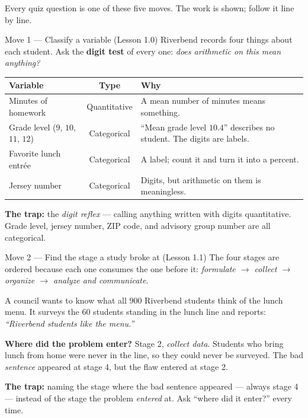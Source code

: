 \documentclass[10pt]{article}
\begin{document}
\small
Every quiz question is one of these five moves. The work is shown; follow it line by line.

\vspace{4pt}
\boxguard[12]
\begin{notesbox}{Move 1 --- Classify a variable (Lesson 1.0)}
\small
Riverbend records four things about each student. Ask the \textbf{digit test} of every one:
\emph{does arithmetic on this mean anything?}

\vspace{2pt}
\renewcommand{\arraystretch}{1.2}
\begin{tabularx}{\linewidth}{@{} X c X @{}}
\rowcolor{frost}
\textbf{Variable} & \textbf{Type} & \textbf{Why} \\
\midrule
Minutes of homework & Quantitative & A mean number of minutes means something. \\
Grade level ($9$, $10$, $11$, $12$) & Categorical & ``Mean grade level $10.4$'' describes no
  student. The digits are labels. \\
Favorite lunch entr\'ee & Categorical & A label; count it and turn it into a percent. \\
Jersey number & Categorical & Digits, but arithmetic on them is meaningless. \\
\end{tabularx}

\vspace{3pt}
\textbf{The trap:} the \emph{digit reflex} --- calling anything written with digits
quantitative. Grade level, jersey number, ZIP code, and advisory group number are all
categorical.
\end{notesbox}

\vspace{3pt}
\boxguard[12]
\begin{notesbox}{Move 2 --- Find the stage a study broke at (Lesson 1.1)}
\small
The four stages are ordered because each one consumes the one before it:
\emph{formulate $\rightarrow$ collect $\rightarrow$ organize $\rightarrow$ analyze and
communicate}.

\vspace{2pt}
A council wants to know what all $900$ Riverbend students think of the lunch menu. It surveys
the $60$ students standing in the lunch line and reports: \emph{``Riverbend students like the
menu.''}

\vspace{2pt}
\textbf{Where did the problem enter?} Stage 2, \emph{collect data}. Students who bring lunch
from home were never in the line, so they could never be surveyed. The bad \emph{sentence}
appeared at stage 4, but the flaw entered at stage 2.

\vspace{2pt}
\textbf{The trap:} naming the stage where the bad sentence appeared --- always stage 4 ---
instead of the stage the problem \emph{entered} at. Ask ``where did it enter?'' every time.
\end{notesbox}
\end{document}
